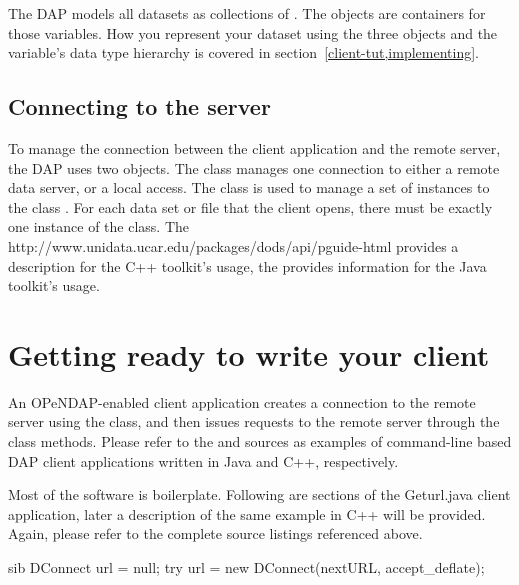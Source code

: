 \documentclass{dods-paper}
\begin{document}
The DAP models all datasets as collections of
.
The 
objects are containers for those variables.  How you represent your
dataset using the three objects and the variable's data type hierarchy
is covered in section~\ref{client-tut,implementing}.


\subsection{Connecting to the server}
  
To manage the connection between the client application and the remote
server, the DAP uses two objects.  The  class manages one
connection to either a remote data server, or a local access.  The
 class is used to manage a set of instances to the
class .  For each data set or file that the client opens,
there must be exactly one instance of the  class.  The
{http://www.unidata.ucar.edu/packages/dods/api/pguide-html} provides a
description for the C++ toolkit's usage, the 
provides information for the Java toolkit's  usage.


\section{Getting ready to write your client}
  
An OPeNDAP-enabled client application creates a connection to the
remote server using the  class, and then issues
requests to the remote server through the  class
methods. Please refer to the  and
 sources as examples of command-line
based DAP client applications written in Java and C++, respectively.

Most of the software is boilerplate. Following are sections of the
Geturl.java client application, later a description of the same
example in C++ will be provided.  Again, please refer to the complete
source listings referenced above.

\begin{vcode}{sib}
 DConnect url = null;
 try {
    url = new DConnect(nextURL, accept_deflate);
 }
\end{vcode}
\end{document}
